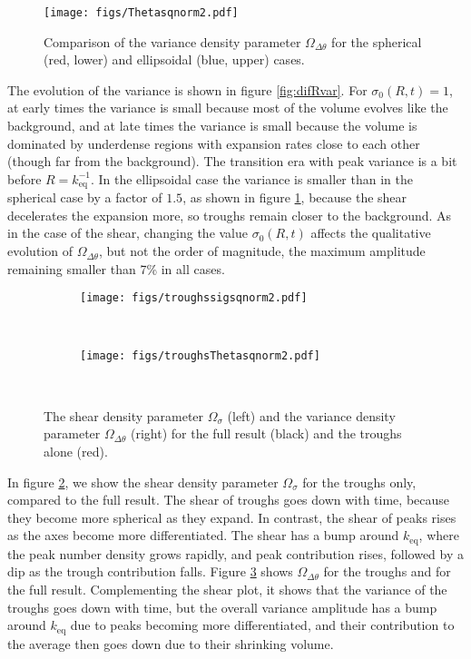 \documentclass[11pt, a4paper]{article}
\newcommand{\fig}[1]{figure \ref{#1}}
\newcommand{\keq}{k_{\mathrm{eq}}}
\newcommand{\Ov}{\Omega_{\Delta\theta}}
\begin{document}
\begin{figure}[t]
  \centering
  \texttt{[image: figs/Thetasqnorm2.pdf]} \\
  \caption{Comparison of the variance density parameter $\Ov$ for the spherical
    (red, lower) and ellipsoidal (blue, upper) cases.}
  \label{fig:var}
\end{figure}

The evolution of the variance is shown in \fig{fig:difRvar}. For $\sigma_0(R,t)=1$, at early times the variance is small because most of the volume evolves like the background, and at late times the variance is small because the volume is dominated by underdense regions with expansion rates close to each other (though far from the background). The transition era with peak variance is a bit before $R=\keq^{-1}$. In the ellipsoidal case the variance is smaller than in the spherical case by a factor of $1.5$, as shown in \fig{fig:var}, because the shear decelerates the expansion more, so troughs remain closer to the background.
As in the case of the shear, changing the value $\sigma_0(R,t)$ affects the qualitative evolution of $\Ov$, but not the order of magnitude, the maximum amplitude remaining smaller than 7\% in all cases.

\begin{figure}[t]
  \centering

  \begin{subfigure}[b]{0.48\textwidth}
    \texttt{[image: figs/troughssigsqnorm2.pdf]}
    \caption{}
    \label{fig:troughsigma}
  \end{subfigure}
  ~
  \begin{subfigure}[b]{0.48\textwidth}
    \texttt{[image: figs/troughsThetasqnorm2.pdf]}
    \caption{}
    \label{fig:troughvar}
  \end{subfigure}
  \\

  \caption{The shear density parameter $\Omega_\sigma$ (left) and the
    variance density parameter $\Ov$ (right) for the full result
    (black) and the troughs alone (red).}
  \label{fig:troughsigma_troughvar}
\end{figure}

In \fig{fig:troughsigma}, we show the shear density parameter $\Omega_\sigma$ for the troughs only, compared to the full result. The shear of troughs goes down with time, because they become more spherical as they expand. In contrast, the shear of peaks rises as the axes become more differentiated. The shear has a bump around $\keq$, where the peak number density grows rapidly, and peak contribution rises, followed by a dip as the trough contribution falls.
Figure \ref{fig:troughvar} shows $\Ov$ for the troughs and for the full result. Complementing the shear plot, it shows that the variance of the troughs goes down with time, but the overall variance amplitude has a bump around $\keq$ due to peaks becoming more differentiated, and their contribution to the average then goes down due to their shrinking volume.
\end{document}
